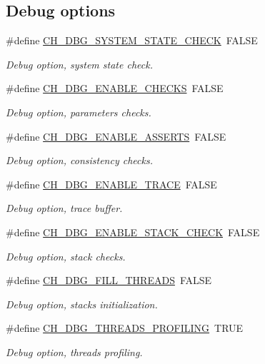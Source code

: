 \subsection*{Debug options}
\begin{DoxyCompactItemize}
\item 
\#define \hyperlink{group__config_ga10db71bc25605169dddc82c1604b0a16}{C\+H\+\_\+\+D\+B\+G\+\_\+\+S\+Y\+S\+T\+E\+M\+\_\+\+S\+T\+A\+T\+E\+\_\+\+C\+H\+E\+C\+K}~F\+A\+L\+S\+E
\begin{DoxyCompactList}\small\item\em Debug option, system state check. \end{DoxyCompactList}\item 
\#define \hyperlink{group__config_gaef984ca3bfd8a71478ad55ce6e56a8bb}{C\+H\+\_\+\+D\+B\+G\+\_\+\+E\+N\+A\+B\+L\+E\+\_\+\+C\+H\+E\+C\+K\+S}~F\+A\+L\+S\+E
\begin{DoxyCompactList}\small\item\em Debug option, parameters checks. \end{DoxyCompactList}\item 
\#define \hyperlink{group__config_gad602fd2546073869a10859158d865b9b}{C\+H\+\_\+\+D\+B\+G\+\_\+\+E\+N\+A\+B\+L\+E\+\_\+\+A\+S\+S\+E\+R\+T\+S}~F\+A\+L\+S\+E
\begin{DoxyCompactList}\small\item\em Debug option, consistency checks. \end{DoxyCompactList}\item 
\#define \hyperlink{group__config_ga8bc4cfd861131aeb3c880347d0068229}{C\+H\+\_\+\+D\+B\+G\+\_\+\+E\+N\+A\+B\+L\+E\+\_\+\+T\+R\+A\+C\+E}~F\+A\+L\+S\+E
\begin{DoxyCompactList}\small\item\em Debug option, trace buffer. \end{DoxyCompactList}\item 
\#define \hyperlink{group__config_gab93d9ee904f15d4f2c26ef2a1394a1d7}{C\+H\+\_\+\+D\+B\+G\+\_\+\+E\+N\+A\+B\+L\+E\+\_\+\+S\+T\+A\+C\+K\+\_\+\+C\+H\+E\+C\+K}~F\+A\+L\+S\+E
\begin{DoxyCompactList}\small\item\em Debug option, stack checks. \end{DoxyCompactList}\item 
\#define \hyperlink{group__config_ga6a859dd249adfb66b9bbf809061ea06c}{C\+H\+\_\+\+D\+B\+G\+\_\+\+F\+I\+L\+L\+\_\+\+T\+H\+R\+E\+A\+D\+S}~F\+A\+L\+S\+E
\begin{DoxyCompactList}\small\item\em Debug option, stacks initialization. \end{DoxyCompactList}\item 
\#define \hyperlink{group__config_gadc9c00c2e5b6e766ded8dfa77c0c90c1}{C\+H\+\_\+\+D\+B\+G\+\_\+\+T\+H\+R\+E\+A\+D\+S\+\_\+\+P\+R\+O\+F\+I\+L\+I\+N\+G}~T\+R\+U\+E
\begin{DoxyCompactList}\small\item\em Debug option, threads profiling. \end{DoxyCompactList}\end{DoxyCompactItemize}

